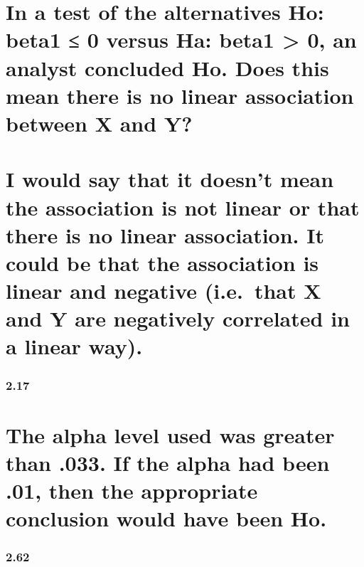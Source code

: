\documentclass[]{article}
\begin{document}
\hypertarget{in-a-test-of-the-alternatives-ho-beta1-0-versus-ha-beta1-0-an-analyst-concluded-ho.-does-this-mean-there-is-no-linear-association-between-x-and-y}{%
\section{In a test of the alternatives Ho: beta1 ≤ 0 versus Ha: beta1
\textgreater{} 0, an analyst concluded Ho. Does this mean there is no
linear association between X and
Y?}\label{in-a-test-of-the-alternatives-ho-beta1-0-versus-ha-beta1-0-an-analyst-concluded-ho.-does-this-mean-there-is-no-linear-association-between-x-and-y}}

\hypertarget{i-would-say-that-it-doesnt-mean-the-association-is-not-linear-or-that-there-is-no-linear-association.-it-could-be-that-the-association-is-linear-and-negative-i.e.that-x-and-y-are-negatively-correlated-in-a-linear-way.}{%
\section{I would say that it doesn't mean the association is not linear
or that there is no linear association. It could be that the association
is linear and negative (i.e.~that X and Y are negatively correlated in a
linear
way).}\label{i-would-say-that-it-doesnt-mean-the-association-is-not-linear-or-that-there-is-no-linear-association.-it-could-be-that-the-association-is-linear-and-negative-i.e.that-x-and-y-are-negatively-correlated-in-a-linear-way.}}

\hypertarget{section-2}{%
\subsubsection{2.17}\label{section-2}}

\hypertarget{the-alpha-level-used-was-greater-than-.033.-if-the-alpha-had-been-.01-then-the-appropriate-conclusion-would-have-been-ho.}{%
\section{The alpha level used was greater than .033. If the alpha had
been .01, then the appropriate conclusion would have been
Ho.}\label{the-alpha-level-used-was-greater-than-.033.-if-the-alpha-had-been-.01-then-the-appropriate-conclusion-would-have-been-ho.}}

\hypertarget{section-3}{%
\subsubsection{2.62}\label{section-3}}
\end{document}

